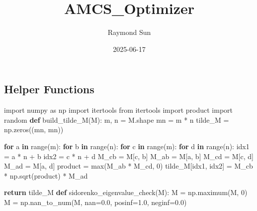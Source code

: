 \documentclass[
  letterpaper,
  DIV=11,
  numbers=noendperiod]{scrartcl}
\title{AMCS\_Optimizer}
\author{Raymond Sun}
\date{2025-06-17}
\newenvironment{Shaded}{\begin{snugshade}}{\end{snugshade}}
\newcommand{\BuiltInTok}[1]{\textcolor[rgb]{0.00,0.23,0.31}{#1}}
\newcommand{\ControlFlowTok}[1]{\textcolor[rgb]{0.00,0.23,0.31}{\textbf{#1}}}
\newcommand{\DecValTok}[1]{\textcolor[rgb]{0.68,0.00,0.00}{#1}}
\newcommand{\FloatTok}[1]{\textcolor[rgb]{0.68,0.00,0.00}{#1}}
\newcommand{\ImportTok}[1]{\textcolor[rgb]{0.00,0.46,0.62}{#1}}
\newcommand{\KeywordTok}[1]{\textcolor[rgb]{0.00,0.23,0.31}{\textbf{#1}}}
\newcommand{\NormalTok}[1]{\textcolor[rgb]{0.00,0.23,0.31}{#1}}
\newcommand{\OperatorTok}[1]{\textcolor[rgb]{0.37,0.37,0.37}{#1}}
\begin{document}
\maketitle


\subsection{Helper Functions}\label{helper-functions}

\begin{Shaded}
\begin{Highlighting}[]
\ImportTok{import}\NormalTok{ numpy }\ImportTok{as}\NormalTok{ np}
\ImportTok{import}\NormalTok{ itertools}
\ImportTok{from}\NormalTok{ itertools }\ImportTok{import}\NormalTok{ product}
\ImportTok{import}\NormalTok{ random}
\KeywordTok{def}\NormalTok{ build\_tilde\_M(M):}
\NormalTok{    m, n }\OperatorTok{=}\NormalTok{ M.shape}
\NormalTok{    mn }\OperatorTok{=}\NormalTok{ m }\OperatorTok{*}\NormalTok{ n}
\NormalTok{    tilde\_M }\OperatorTok{=}\NormalTok{ np.zeros((mn, mn))}

    \ControlFlowTok{for}\NormalTok{ a }\KeywordTok{in} \BuiltInTok{range}\NormalTok{(m):}
        \ControlFlowTok{for}\NormalTok{ b }\KeywordTok{in} \BuiltInTok{range}\NormalTok{(n):}
            \ControlFlowTok{for}\NormalTok{ c }\KeywordTok{in} \BuiltInTok{range}\NormalTok{(m):}
                \ControlFlowTok{for}\NormalTok{ d }\KeywordTok{in} \BuiltInTok{range}\NormalTok{(n):}
\NormalTok{                    idx1 }\OperatorTok{=}\NormalTok{ a }\OperatorTok{*}\NormalTok{ n }\OperatorTok{+}\NormalTok{ b}
\NormalTok{                    idx2 }\OperatorTok{=}\NormalTok{ c }\OperatorTok{*}\NormalTok{ n }\OperatorTok{+}\NormalTok{ d}
\NormalTok{                    M\_cb }\OperatorTok{=}\NormalTok{ M[c, b]}
\NormalTok{                    M\_ab }\OperatorTok{=}\NormalTok{ M[a, b]}
\NormalTok{                    M\_cd }\OperatorTok{=}\NormalTok{ M[c, d]}
\NormalTok{                    M\_ad }\OperatorTok{=}\NormalTok{ M[a, d]}
\NormalTok{                    product }\OperatorTok{=} \BuiltInTok{max}\NormalTok{(M\_ab }\OperatorTok{*}\NormalTok{ M\_cd, }\DecValTok{0}\NormalTok{)}
\NormalTok{                    tilde\_M[idx1, idx2] }\OperatorTok{=}\NormalTok{ M\_cb }\OperatorTok{*}\NormalTok{ np.sqrt(product) }\OperatorTok{*}\NormalTok{ M\_ad}

    \ControlFlowTok{return}\NormalTok{ tilde\_M}
\KeywordTok{def}\NormalTok{ sidorenko\_eigenvalue\_check(M):}
\NormalTok{    M }\OperatorTok{=}\NormalTok{ np.maximum(M, }\DecValTok{0}\NormalTok{)}
\NormalTok{    M }\OperatorTok{=}\NormalTok{ np.nan\_to\_num(M, nan}\OperatorTok{=}\FloatTok{0.0}\NormalTok{, posinf}\OperatorTok{=}\FloatTok{1.0}\NormalTok{, neginf}\OperatorTok{=}\FloatTok{0.0}\NormalTok{)}


\end{Highlighting}
\end{Shaded}
\end{document}
